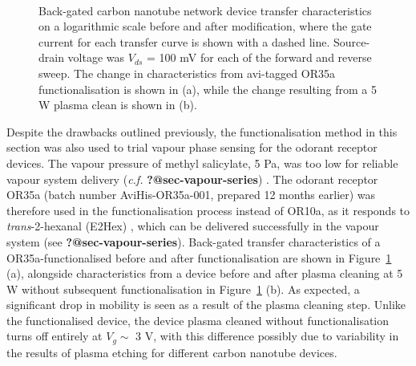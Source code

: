 \documentclass[
  a4paper,
]{scrbook}
\begin{document}
\begin{figure}
\begin{minipage}[t]{0.45\linewidth}
{{}

}

\end{minipage}%
%
\begin{minipage}[t]{0.01\linewidth}

{\centering 

~

}

\end{minipage}%

\caption{\label{fig-OR35a-TX-comparison}Back-gated carbon nanotube
network device transfer characteristics on a logarithmic scale before
and after modification, where the gate current for each transfer curve
is shown with a dashed line. Source-drain voltage was \(V_{ds}\) = 100
mV for each of the forward and reverse sweep. The change in
characteristics from avi-tagged OR35a functionalisation is shown in (a),
while the change resulting from a 5 W plasma clean is shown in (b).}

\end{figure}

Despite the drawbacks outlined previously, the functionalisation method
in this section was also used to trial vapour phase sensing for the
odorant receptor devices. The vapour pressure of methyl salicylate, 5
Pa, was too low for reliable vapour system delivery (\emph{c.f.}
\textbf{?@sec-vapour-series}) \autocite{MeSal}. The odorant receptor
OR35a (batch number AviHis-OR35a-001, prepared 12 months earlier) was
therefore used in the functionalisation process instead of OR10a, as it
responds to \emph{trans}-2-hexanal (E2Hex) \autocite{Murugathas2019a},
which can be delivered successfully in the vapour system (see
\textbf{?@sec-vapour-series}). Back-gated transfer characteristics of a
OR35a-functionalised before and after functionalisation are shown in
Figure~\ref{fig-OR35a-TX-comparison} (a), alongside characteristics from
a device before and after plasma cleaning at 5 W without subsequent
functionalisation in Figure~\ref{fig-OR35a-TX-comparison} (b). As
expected, a significant drop in mobility is seen as a result of the
plasma cleaning step. Unlike the functionalised device, the device
plasma cleaned without functionalisation turns off entirely at
\(V_g \sim\) 3 V, with this difference possibly due to variability in
the results of plasma etching for different carbon nanotube devices.
\end{document}
